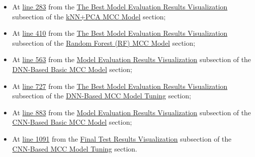 \documentclass[
]{report}
\providecommand{\tightlist}{%
  \setlength{\itemsep}{0pt}\setlength{\parskip}{0pt}}
\begin{document}
\begin{itemize}
\tightlist
\item
  At \href{https://github.com/AzKurban-edX-DS/edx.capstone.choose-your-own/blob/main/r/index.R\#L283}{line 283} from the \href{https://github.com/AzKurban-edX-DS/edx.capstone.choose-your-own/blob/main/r/index.R\#L235-L291}{The Best Model Evaluation Results Visualization} subsection of the \href{https://github.com/AzKurban-edX-DS/edx.capstone.choose-your-own/blob/main/r/index.R\#L178-L291}{kNN+PCA MCC Model} section;
\item
  At \href{https://github.com/AzKurban-edX-DS/edx.capstone.choose-your-own/blob/main/r/index.R\#L410}{line 410} from the \href{https://github.com/AzKurban-edX-DS/edx.capstone.choose-your-own/blob/main/r/index.R\#L345-L418}{The Best Model Evaluation Results Visualization} subsection of the \href{https://github.com/AzKurban-edX-DS/edx.capstone.choose-your-own/blob/main/r/index.R\#L292-L418}{Random Forest (RF) MCC Model} section;
\item
  At \href{https://github.com/AzKurban-edX-DS/edx.capstone.choose-your-own/blob/main/r/index.R\#L563}{line 563} from the \href{https://github.com/AzKurban-edX-DS/edx.capstone.choose-your-own/blob/main/r/index.R\#L472-L571}{Model Evaluation Results Visualization} subsection of the \href{https://github.com/AzKurban-edX-DS/edx.capstone.choose-your-own/blob/main/r/index.R\#L420-L571}{DNN-Based Basic MCC Model} section;
\item
  At \href{https://github.com/AzKurban-edX-DS/edx.capstone.choose-your-own/blob/main/r/index.R\#L727}{line 727} from the \href{https://github.com/AzKurban-edX-DS/edx.capstone.choose-your-own/blob/main/r/index.R\#L642-L734}{The Best Model Evaluation Results Visualization} subsection of the \href{https://github.com/AzKurban-edX-DS/edx.capstone.choose-your-own/blob/main/r/index.R\#L572-L734}{DNN-Based MCC Model Tuning} section;
\item
  At \href{https://github.com/AzKurban-edX-DS/edx.capstone.choose-your-own/blob/main/r/index.R\#L883}{line 883} from the \href{https://github.com/AzKurban-edX-DS/edx.capstone.choose-your-own/blob/main/r/index.R\#L793-L891}{Model Evaluation Results Visualization} subsection of the \href{https://github.com/AzKurban-edX-DS/edx.capstone.choose-your-own/blob/main/r/index.R\#L738-L891}{CNN-Based Basic MCC Model} section;
\item
  At \href{https://github.com/AzKurban-edX-DS/edx.capstone.choose-your-own/blob/main/r/index.R\#L1091}{line 1091} from the \href{https://github.com/AzKurban-edX-DS/edx.capstone.choose-your-own/blob/main/r/index.R\#L978-L1178}{Final Test Results Visualization} subsection of the \href{https://github.com/AzKurban-edX-DS/edx.capstone.choose-your-own/blob/main/r/index.R\#L892-L1178}{CNN-Based MCC Model Tuning} section.
\end{itemize}
\end{document}
